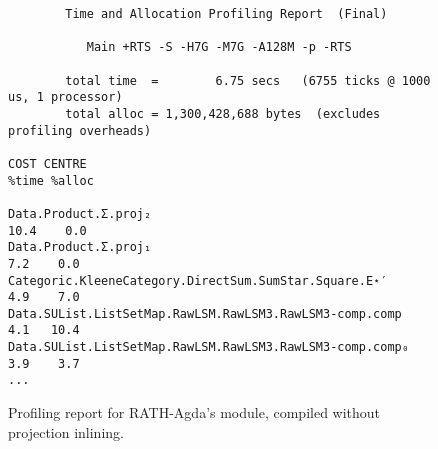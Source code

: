 \begin{figure}
\begin{verbatim}
        Time and Allocation Profiling Report  (Final)

           Main +RTS -S -H7G -M7G -A128M -p -RTS

        total time  =        6.75 secs   (6755 ticks @ 1000 us, 1 processor)
        total alloc = 1,300,428,688 bytes  (excludes profiling overheads)

COST CENTRE                                                 %time %alloc

Data.Product.Σ.proj₂                                         10.4    0.0
Data.Product.Σ.proj₁                                          7.2    0.0
Categoric.KleeneCategory.DirectSum.SumStar.Square.E⋆′         4.9    7.0
Data.SUList.ListSetMap.RawLSM.RawLSM3.RawLSM3-comp.comp       4.1   10.4
Data.SUList.ListSetMap.RawLSM.RawLSM3.RawLSM3-comp.comp₀      3.9    3.7
...
\end{verbatim}
\caption{Profiling report for RATH-Agda's  module, compiled without projection inlining.}
\label{fig:main_prof}
\end{figure}
